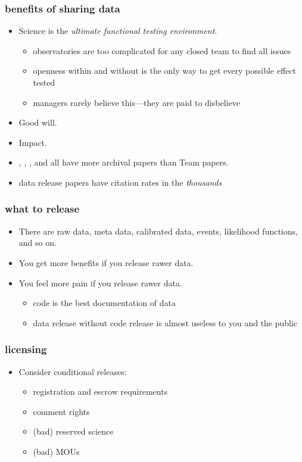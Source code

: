 \documentclass[pdftex]{beamer}
\begin{document}
\begin{frame}
  \frametitle{benefits of sharing data}
  \begin{itemize}
  \item Science is the \emph{ultimate functional testing environment}.
    \begin{itemize}
    \item observatories are too complicated for any closed team to find all issues
    \item openness within and without is the only way to get every possible effect tested
    \item managers rarely believe this---they are paid to disbelieve
    \end{itemize}
  \item Good will.
  \item Impact.
  \end{itemize}
    \begin{itemize}
    \item {}, , , and  all have more archival papers than Team papers.
    \item data release papers have citation rates in the \emph{thousands}
    \end{itemize}
\end{frame}

\begin{frame}
  \frametitle{what to release}
  \begin{itemize}
  \item There are raw data, meta data, calibrated data, events, likelihood functions, and so on.
  \item You get more benefits if you release rawer data.
  \item You feel more pain if you release rawer data.
    \begin{itemize}
    \item code is the best documentation of data
    \item data release without code release is almost useless to you and the public
    \end{itemize}
  \end{itemize}
\end{frame}

\begin{frame}
  \frametitle{licensing}
  \begin{itemize}
  \item Consider conditional releases:
    \begin{itemize}
    \item registration and escrow requirements
    \item comment rights
    \item (bad) reserved science
    \item (bad) MOUs
    \end{itemize}
  \end{itemize}
\end{frame}
\end{document}
